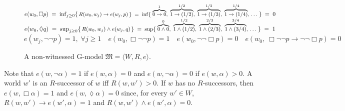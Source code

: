 \documentclass[copyright,creativecommons]{eptcs}
\newcommand{\GM}{\mbox{$\mathrm{G}$}}
\newcommand{\Diam}{\lozenge}
\newcommand{\stru}[1]{\langle #1 \rangle} %
\newcommand{\M}{\mathfrak{M}}
\renewcommand{\a}{\alpha}
\newcommand{\medfont}{\fontsize{9pt}{10pt}\selectfont}
\begin{document}
\begin{figure}[t]
\begin{minipage}{0.45\linewidth}
  \end{minipage}\hspace{4ex}
  \small %
  $\small e(w_0,\Box p) \;=\; \inf_{j\geq 0}\{\, \mbox{\medfont $R(w_0,w_j)\to
  e(w_j,p) \,\} \;=\; \inf\{\; \overbrace{0\to 0}^1,\;\overbrace{1 \to
    (1/2)}^{1/2}, \; \overbrace{1 \to (1/3)}^{1/3}, \; \overbrace{1
    \to (1/4)}^{1/4}, \,\dots \;$}\}\;=\;0 $
  \\[1ex]
  $\small e(w_0,\Diamond q) \;=\; \sup_{j\geq 0}\{\, \mbox{\medfont $R(w_0,w_j)\land
  e(w_j,q) \,\} \;=\; \sup\{\; \overbrace{0\land 0}^0,\;\overbrace{1
    \land (1/2)}^{1/2}, \; \overbrace{1 \land (2/3)}^{2/3}, \;
  \overbrace{1 \land (3/4)}^{3/4}, \,\dots \;$}\}\;=\;1 $
  \\[2ex]
  $e(w_j,\neg \neg p) = 1,\; \forall j\geq 1\quad e(w_0,\Box\neg\neg
  p) =1 \quad e(w_0,\neg\neg \Box p) =0 \quad e(w_0,\ \Box\neg\neg
  p\to \neg\neg \Box p) =0 $
  \caption{A non-witnessed \GM-model $\M=\stru{W,R,e}$.}  
  \label{fig:nonWitn}
\end{figure}


\noindent
Note that $e(w,\neg\a)=1$ if $e(w,\a)=0$ and $e(w,\neg\a)=0$ if
$e(w,\a)>0$.  A world $w'$ is an $R$-successor of $w$ iff $R(w,
w')>0$. If $w$ has no $R$-successors, then $e(w,\Box\a)=1$ and
$e(w,\Diam\a)=0$ since, for every $w'\in W$, $R(w,w') \to e(w',\a) =
1$ and $R(w,w')\land e(w',\a) = 0$.  

\end{document}

